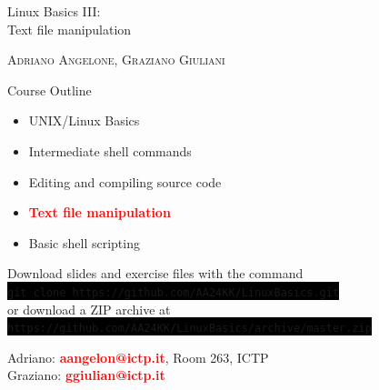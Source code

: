 \documentclass[unknownkeysallowed, 10pt, a4 paper, handout]{beamer}
\newcommand{\focus}[1]{\textbf{\textcolor{red}{#1}}}
\newcommand{\code}[1]{\colorbox{black}{\color{green}\texttt{#1}}}
\begin{document}
\begin{frame}
  \begin{center}


    \begin{block}{}
      \Large
      \centering
      Linux Basics III:\\
      Text file manipulation
    \end{block}

    \vspace{6mm}
    \large
    \textsc{Adriano Angelone, Graziano Giuliani} \\

  \end{center}
\end{frame}

\begin{frame}[label=outline]{Course Outline}
  \begin{itemize}
    \item UNIX/Linux Basics
    \item Intermediate shell commands
    \item Editing and compiling source code
    \item \focus{Text file manipulation}
    \item Basic shell scripting
  \end{itemize}

  \vspace{6mm}

  \centering
  Download slides and exercise files with the command\\
  \code{git clone https://github.com/AA24KK/LinuxBasics.git}\\
  \vspace{1mm}
  or download a ZIP archive at
  \vspace{1mm}
  \code{https://github.com/AA24KK/LinuxBasics/archive/master.zip}

  \vspace{2mm}

  Adriano: \focus{aangelon@ictp.it}, Room 263, ICTP\\
  Graziano: \focus{ggiulian@ictp.it}

\end{frame}
\end{document}
